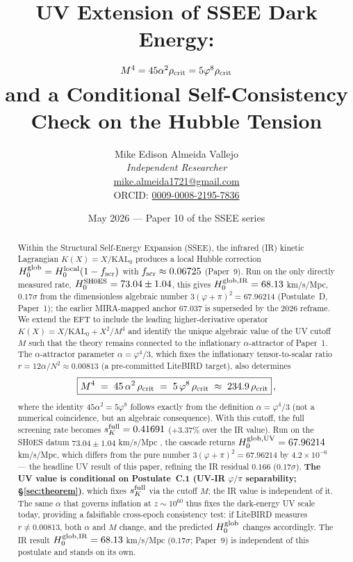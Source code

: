 \documentclass[12pt,a4paper]{article}
\title{\textbf{UV Extension of SSEE Dark Energy:\\
       $M^4 = 45\alpha^2\rho_{\rm crit} = 5\phiG^8\rho_{\rm crit}$\\
       and a Conditional Self-Consistency Check on the Hubble Tension}}
\author{Mike Edison Almeida Vallejo \\
\small \textit{Independent Researcher} \\
\small \href{mailto:mike.almeida1721@gmail.com}{mike.almeida1721@gmail.com} \\
\small ORCID: \href{https://orcid.org/0009-0008-2195-7836}{0009-0008-2195-7836}
}
\date{May 2026 --- Paper 10 of the SSEE series}
\newcommand{\phiG}{\varphi}
\newcommand{\KAL}{\mathrm{KAL}_0}
\newcommand{\sK}{s_K}
\newcommand{\rhoc}{\rho_{\rm crit}}
\begin{document}
\maketitle

\begin{abstract}
Within the Structural Self-Energy Expansion (SSEE), the infrared (IR) kinetic
Lagrangian $K(X) = X/\KAL$ produces a local Hubble correction
$H_0^{\rm glob} = H_0^{\rm local}(1-f_{\rm scr})$ with $f_{\rm scr}\approx 0.06725$
(Paper~9). Run on the only directly measured rate, $H_0^{\rm SH0ES}=73.04\pm1.04$,
this gives $H_0^{\rm glob,IR}=68.13$ km/s/Mpc, $0.17\sigma$ from the dimensionless
algebraic number $3(\phiG+\pi)^2=67.96214$ (Postulate~D, Paper~1); the
earlier MIRA-mapped anchor $67.037$ is superseded
by the 2026 reframe.
We extend the EFT to include the leading higher-derivative operator
$K(X) = X/\KAL + X^2/M^4$ and identify the unique algebraic value of the
UV cutoff $M$ such that the theory remains connected to the inflationary
$\alpha$-attractor of Paper~1.
The $\alpha$-attractor parameter $\alpha = \phiG^4/3$, which fixes the
inflationary tensor-to-scalar ratio $r = 12\alpha/N^2 \approx 0.00813$
(a pre-committed LiteBIRD target), also determines
\begin{equation*}
  \boxed{M^4 \;=\; 45\,\alpha^2\,\rhoc \;=\; 5\,\phiG^8\,\rhoc
         \;\approx\; 234.9\,\rhoc}\,,
\end{equation*}
where the identity $45\alpha^2 = 5\phiG^8$ follows exactly from the definition
$\alpha = \phiG^4/3$ (not a numerical coincidence, but an algebraic consequence).
With this cutoff, the full screening rate becomes
$\sK^{\rm full} = 0.41691$ ($+3.37\%$ over the IR value). Run on the SH0ES
datum $73.04\pm1.04$ km/s/Mpc \citep{Riess2022}, the cascade returns
$H_0^{\rm glob,UV} = 67.96214$ km/s/Mpc, which differs from the pure number
$3(\phiG+\pi)^2 = 67.96214$ by $4.2\times10^{-6}$ --- the headline UV
result of this paper, refining the IR residual $0.166$ ($0.17\sigma$).
\textbf{The UV value is conditional on Postulate~C.1 (UV-IR $\varphi/\pi$
separability; §\ref{sec:theorem})}, which fixes $\sK^{\rm full}$ via the
cutoff $M$; the IR value is independent of it.
The same $\alpha$ that governs inflation at $z \sim 10^{60}$ thus fixes the
dark-energy UV scale today, providing a falsifiable cross-epoch consistency test:
if LiteBIRD measures $r \neq 0.00813$, both $\alpha$ and $M$ change, and the
predicted $H_0^{\rm glob}$ changes accordingly.  The IR result
$H_0^{\rm glob,IR} = 68.13$ km/s/Mpc ($0.17\sigma$; Paper~9) is
independent of this postulate and stands on its own.
\end{abstract}
\end{document}
